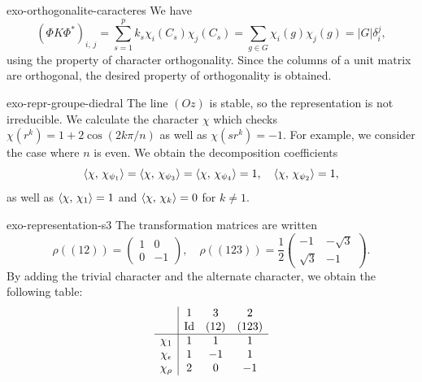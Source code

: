 
\begin{correction}{exo-orthogonalite-caracteres}
We have
\begin{equation*}
(\Phi K \Phi^*)_{i, \, j} = \sum_{s = 1}^p{k_s \chi_i (C_s) \chi_j (C_s)} = \sum_{g \in G}{\chi_i (g) \chi_j (g)} = |G| \delta_i^j,
\end{equation*}
 using the property of character orthogonality. Since the columns of a unit matrix are orthogonal, the desired property of orthogonality is obtained.
\end{correction}
 
 
\begin{correction}{exo-repr-groupe-diedral}
 The line $ (Oz) $ is stable, so the representation is not irreducible. We calculate the character $ \chi $ which checks $ \chi (r^k) = 1 + 2 \cos (2k \pi/n) $ as well as $ \chi (sr^k) =-1 $. For example, we consider the case where $ n $ is even. We obtain the decomposition coefficients
\begin{equation*}
\langle \chi,\,\chi_{\psi_1}\rangle = \langle \chi,\,\chi_{\psi_3}\rangle = \langle \chi,\,\chi_{\psi_4}\rangle = 1, \quad \langle \chi,\,\chi_{\psi_2}\rangle = 1,
\end{equation*}
as well as $ \langle \chi,\,\chi_{1}\rangle = 1 $ and $ \langle \chi,\,\chi_{k}\rangle = 0 $ for $ k \neq 1 $.
\end{correction}
 
 
\begin{correction}{exo-representation-s3}
 The transformation matrices are written
\begin{equation*}
\rho ((12)) = \begin{pmatrix} 1 & 0 \\0 & -1 \end{pmatrix}, \quad \rho ((123)) = \frac{1}{2} \begin{pmatrix} -1 & - \sqrt{3} \\\sqrt{3} & -1 \end{pmatrix}.
\end{equation*}
By adding the trivial character and the alternate character, we obtain the following table:
\begin{equation*}
\begin{array}{c | ccc} & 1 & 3 & 2 \\& \operatorname{Id} & (12) & (123) \\\hline \chi_1 & 1 & 1 & 1 \\\chi_{\epsilon} & 1 & -1 & 1 \\\chi_\rho & 2 & 0 & -1 \end{array}
\end{equation*}
\end{correction}
 
